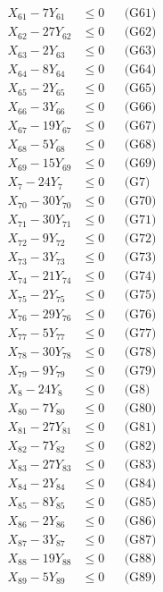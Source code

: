 \documentclass[a4paper,10pt]{article}
\begin{document}
{\begin{align}
X_{61} - 7Y_{61} &\leq 0 && \text{(G61)} \\
X_{62} - 27Y_{62} &\leq 0 && \text{(G62)} \\
X_{63} - 2Y_{63} &\leq 0 && \text{(G63)} \\
X_{64} - 8Y_{64} &\leq 0 && \text{(G64)} \\
X_{65} - 2Y_{65} &\leq 0 && \text{(G65)} \\
X_{66} - 3Y_{66} &\leq 0 && \text{(G66)} \\
X_{67} - 19Y_{67} &\leq 0 && \text{(G67)} \\
X_{68} - 5Y_{68} &\leq 0 && \text{(G68)} \\
X_{69} - 15Y_{69} &\leq 0 && \text{(G69)} \\
X_{7} - 24Y_{7} &\leq 0 && \text{(G7)} \\
\allowbreak
X_{70} - 30Y_{70} &\leq 0 && \text{(G70)} \\
X_{71} - 30Y_{71} &\leq 0 && \text{(G71)} \\
X_{72} - 9Y_{72} &\leq 0 && \text{(G72)} \\
X_{73} - 3Y_{73} &\leq 0 && \text{(G73)} \\
X_{74} - 21Y_{74} &\leq 0 && \text{(G74)} \\
X_{75} - 2Y_{75} &\leq 0 && \text{(G75)} \\
X_{76} - 29Y_{76} &\leq 0 && \text{(G76)} \\
X_{77} - 5Y_{77} &\leq 0 && \text{(G77)} \\
X_{78} - 30Y_{78} &\leq 0 && \text{(G78)} \\
X_{79} - 9Y_{79} &\leq 0 && \text{(G79)} \\
X_{8} - 24Y_{8} &\leq 0 && \text{(G8)} \\
X_{80} - 7Y_{80} &\leq 0 && \text{(G80)} \\
X_{81} - 27Y_{81} &\leq 0 && \text{(G81)} \\
X_{82} - 7Y_{82} &\leq 0 && \text{(G82)} \\
X_{83} - 27Y_{83} &\leq 0 && \text{(G83)} \\
X_{84} - 2Y_{84} &\leq 0 && \text{(G84)} \\
X_{85} - 8Y_{85} &\leq 0 && \text{(G85)} \\
X_{86} - 2Y_{86} &\leq 0 && \text{(G86)} \\
X_{87} - 3Y_{87} &\leq 0 && \text{(G87)} \\
X_{88} - 19Y_{88} &\leq 0 && \text{(G88)} \\
\allowbreak
X_{89} - 5Y_{89} &\leq 0 && \text{(G89)} \\

\end{align}}
\end{document}
